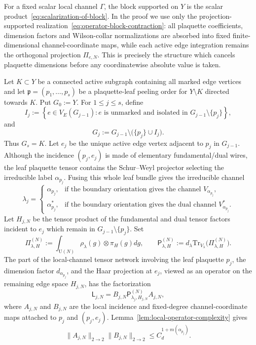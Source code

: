 \documentclass[11pt,a4paper,reqno]{amsart}
\theoremstyle{definition}
\theoremstyle{remark}
\newcommand\U{{\mathrm U}}
\newcommand\Tr{{\mathrm{Tr}}}
\begin{document}
For a fixed scalar local channel $\Gamma$, the block supported on $Y$ is the scalar product~\eqref{eq:scalarization-of-block}.  In the proof we use only the projection-supported realization~\eqref{eq:operator-block-contraction}: all plaquette coefficients, dimension factors and Wilson-collar normalizations are absorbed into fixed finite-dimensional channel-coordinate maps, while each active edge integration remains the orthogonal projection $\Pi_{e,N}$.  This is precisely the structure which cancels plaquette dimensions before any coordinatewise absolute value is taken.

Let $K\subset Y$ be a connected active subgraph containing all marked edge vertices and let $\mathfrak p=(p_1,\ldots,p_s)$ be a plaquette-leaf peeling order for $Y\setminus K$ directed towards $K$.  Put $G_0:=Y$. For $1\le j\le s$, define
\[
I_j:=\left\{e\in V_E(G_{j-1}):
 e\text{ is unmarked and isolated in }G_{j-1}\setminus\{p_j\}\right\},
\]
and
\begin{equation}\label{eq:peeling-graphs}
G_j:=G_{j-1}\setminus\bigl(\{p_j\}\cup I_j\bigr).
\end{equation}
Thus $G_s=K$.  Let $e_j$ be the unique active edge vertex adjacent to $p_j$ in $G_{j-1}$.  Although the incidence $(p_j,e_j)$ is made of elementary fundamental/dual wires, the leaf plaquette tensor contains the Schur--Weyl projector selecting the irreducible label $\alpha_{p_j}$.  Fusing this whole leaf bundle gives the irreducible channel
\[
\lambda_j=
\begin{cases}
\alpha_{p_j}, & \text{if the boundary orientation gives the channel }V_{\alpha_{p_j}},\\
\alpha_{p_j}^*, & \text{if the boundary orientation gives the dual channel }V_{\alpha_{p_j}}^* .
\end{cases}
\]
Let $H_{j,N}$ be the tensor product of the fundamental and dual tensor factors incident to $e_j$ which remain in $G_{j-1}\setminus\{p_j\}$.  Set
\begin{equation}\label{eq:peeling-projection-definition}
\Pi_{\lambda,H}^{(N)}
:=
\int_{\U(N)}\rho_\lambda(g)\otimes\pi_H(g) dg,
\qquad
\mathsf P_{\lambda,H}^{(N)}
:=
d_\lambda\Tr_{V_\lambda}\bigl(\Pi_{\lambda,H}^{(N)}\bigr).
\end{equation}
The part of the local-channel tensor network involving the leaf plaquette $p_j$, the dimension factor $d_{\alpha_{p_j}}$, and the Haar projection at $e_j$, viewed as an operator on the remaining edge space $H_{j,N}$, has the factorization
\begin{equation}\label{eq:leaf-factorization}
\mathsf L_{j,N}
=
B_{j,N} \mathsf P_{\lambda_j,H_{j,N}}^{(N)} A_{j,N},
\end{equation}
where $A_{j,N}$ and $B_{j,N}$ are the local incidence and fixed-degree channel-coordinate maps attached to $p_j$ and $(p_j,e_j)$.  Lemma~\ref{lem:local-operator-complexity} gives
\begin{equation}\label{eq:leaf-AB-bound}
\|A_{j,N}\|_{2\to2} \|B_{j,N}\|_{2\to2}
\le C_d^{1+m(\alpha_{p_j})}.
\end{equation}
\end{document}
